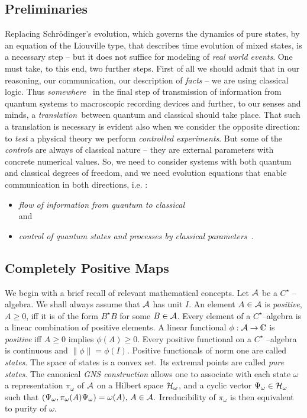 \documentclass[12pt]{article}
\def\complex{{\kern .1em {\raise .47ex \hbox
{$\scriptscriptstyle
|$}}
\kern -.4em {\rm C}}}
\begin{document}
\subsection{Preliminaries}
Replacing Schr\"odinger's evolution, which governs the dynamics
of pure states, by an equation of the
Liouville type, that describes time evolution of mixed states,
is a necessary step -- but it does not suffice for modeling
of {\sl real world events}.  One must take,  to this end,  two further steps. 
First of all we should admit that in our reasoning,  our communication,  our
description of {\sl facts} -- we are using classical logic.  Thus {\sl somewhere }\
in the final step of transmission of information from quantum systems to
macroscopic recording devices and further, to our senses and minds,
a {\sl translation}\ between quantum and classical
 should
take place.  That such a translation is necessary is evident also when we
consider the opposite direction:  to {\sl test} a physical theory we perform 
{\sl controlled experiments}.  But some of the {\sl controls} are always of
classical nature -- they are external parameters with concrete numerical
values.  So,  we need to consider systems with both quantum and classical
degrees of freedom,  and we need evolution equations that enable communication 
in both directions,  i.e. :  \begin{itemize}
\item {\sl flow of information from quantum to classical} \\and \item 
{\sl control of quantum states and processes by
classical parameters}\ . 
\end{itemize}

\subsection{Completely Positive Maps}
We begin with a brief recall of relevant mathematical concepts.  
Let ${\cal A}$ be a $C^{\star}$ -- algebra.  We shall always assume that $
{\cal A}$ has unit $I$.  An element $A\in {\cal A}$ is {\sl positive},  $A\geq 0$, 
iff it is of the form $B^\star B$ for some $B\in {\cal A}$.  Every element of
a $C^{\star}$--algebra is a linear combination of positive elements.  A
linear functional $\phi :  {\cal A} \rightarrow \complex$ is {\sl positive} iff 
$A\geq 0$
implies $\phi  (A) \geq 0$.  Every positive functional on a $C^{\star}$
--algebra is continuous and $\| \phi\| = \phi  (I). $ Positive functionals of
norm one are called {\sl states}.  The space of states is a convex set.  Its
extremal points are called {\sl pure states}.  The canonical
 {\sl GNS construction}
allows one to associate with each state $\omega$ a representation $
\pi_\omega $ of ${\cal A}$ on a Hilbert space ${\cal H}_\omega$,  and a
cyclic vector $\Psi_\omega\in{\cal H}_\omega$ such that $ (\Psi_\omega
, \pi_\omega  (A)\Psi_\omega ) = \omega  (A) , \,  A\in {\cal A} . $
Irreducibility of $\pi_\omega$ is then equivalent to purity of $\omega . $
\end{document}

